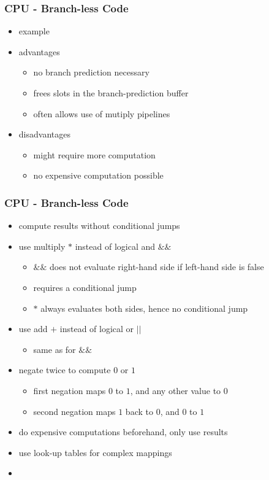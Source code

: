 \begin{frame}
 \frametitle{CPU - Branch-less Code}
 \begin{itemize}
  \item example 
  \item advantages
  \begin{itemize}
   \item no branch prediction necessary
   \item frees slots in the branch-prediction buffer
   \item often allows use of mutiply pipelines
  \end{itemize}
  \item disadvantages
  \begin{itemize}
   \item might require more computation
   \item no expensive computation possible
  \end{itemize}
 \end{itemize}
\end{frame}

\begin{frame}
 \frametitle{CPU - Branch-less Code}
 \begin{itemize}
  \item compute results without conditional jumps
  \item use multiply \( * \) instead of logical and \( \&\& \)
   \begin{itemize}
    \item \( \&\& \) does not evaluate right-hand side if left-hand side is false
    \item requires a conditional jump
    \item \( * \) always evaluates both sides, hence no conditional jump
   \end{itemize}
  \item use add \( + \) instead of logical or \( \vert\vert \)
   \begin{itemize}
    \item same as for \( \&\& \)
   \end{itemize}
  \item negate twice to compute \( 0 \) or \( 1 \)
   \begin{itemize}
    \item first negation maps \( 0 \) to \( 1 \), and any other value to 0
    \item second negation maps \( 1 \) back to \( 0 \), and \( 0 \) to \( 1 \)
   \end{itemize}
  \item do expensive computations beforehand, only use results
  \item use look-up tables for complex mappings
  \item {}
 \end{itemize}
\end{frame}

